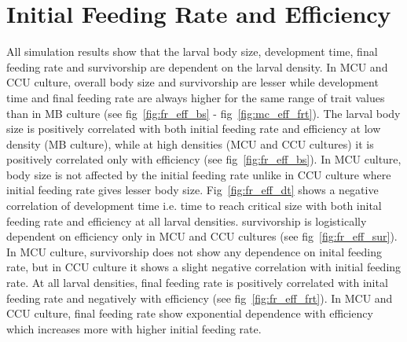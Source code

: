 \section{Initial Feeding Rate and Efficiency}
All simulation results show that the larval body size, development time, final feeding rate and survivorship are dependent on the larval density. In MCU and CCU culture, overall body size and survivorship are lesser while development time and final feeding rate are always higher for the same range of trait values than in MB culture (see fig~\ref{fig:fr_eff_bs} - fig~\ref{fig:mc_eff_frt}). The larval body size is positively correlated with both initial feeding rate and efficiency at low density (MB culture), while at high densities (MCU and CCU cultures) it is positively correlated only with efficiency (see fig~\ref{fig:fr_eff_bs}). In MCU culture, body size is not affected by the initial feeding rate unlike in CCU culture where initial feeding rate gives lesser body size. Fig~\ref{fig:fr_eff_dt} shows a negative correlation of development time i.e. time to reach critical size with both inital feeding rate and efficiency at all larval densities. survivorship is logistically dependent on efficiency only in MCU and CCU cultures (see fig~\ref{fig:fr_eff_sur}). In MCU culture, survivorship does not show any dependence on inital feeding rate, but in CCU culture it shows a slight negative correlation with initial feeding rate. At all larval densities, final feeding rate is positively correlated with inital feeding rate and negatively with efficiency (see fig~\ref{fig:fr_eff_frt}). In MCU and CCU culture, final feeding rate show exponential dependence with efficiency which increases more with higher initial feeding rate.
